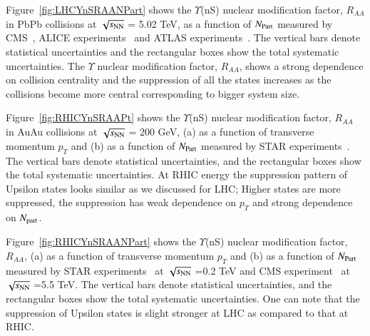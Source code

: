 Figure~\ref{fig:LHCYnSRAANPart} shows
the $\Upsilon$(nS) nuclear modification factor, $R_{AA}$
in PbPb collisions at $\sqrt{s_{\rm NN}}$ = 5.02 TeV, as a function of $N_{\rm Part}$
measured by CMS~\cite{CMS:2018zza}, ALICE experiments~\cite{ALICE:2020wwx}
and ATLAS experiments~\cite{ALICE:2020wwx}.
 The vertical bars denote statistical uncertainties and the rectangular
boxes show the total systematic uncertainties. The $\Upsilon$ nuclear modification
factor, $R_{AA}$, shows a strong dependence on collision centrality and the
suppression of all the states increases as the collisions become more central
corresponding to bigger system size. 

    
Figure~\ref{fig:RHICYnSRAAPt} shows the $\Upsilon$(nS) nuclear modification factor, $R_{AA}$
in AuAu collisions at $\sqrt{s_{\rm NN}}$ = 200 GeV,
 (a) as a function of transverse momentum $p_{T}$
and (b) as a function of $N_{\rm Part}$ measured by STAR
experiments~\cite{Wang:2019vau}. The vertical bars denote
statistical uncertainties, and the rectangular boxes show the total systematic
uncertainties. At RHIC energy the suppression pattern of Upsilon states
looks similar as we discussed for LHC; Higher states are more suppressed,
the suppression has weak dependence on $p_T$ and strong dependence on $N_{\rm part}$.



Figure~\ref{fig:RHICYnSRAANPart} shows
  the $\Upsilon$(nS) nuclear modification factor, $R_{AA}$, (a) as a function of transverse momentum $p_{T}$
  and (b) as a function of $N_{\rm Part}$ measured by STAR experiments~\cite{Wang:2019vau} at $\sqrt{s_{\rm NN}}$ =0.2 TeV and
  CMS experiment~\cite{CMS:2018zza} at $\sqrt{s_{\rm NN}}$ =5.5 TeV.
The vertical bars denote statistical uncertainties, and the
rectangular boxes show the total systematic uncertainties.
One can note that the suppression of Upsilon states is slight stronger at
LHC as compared to that at RHIC.   


  


